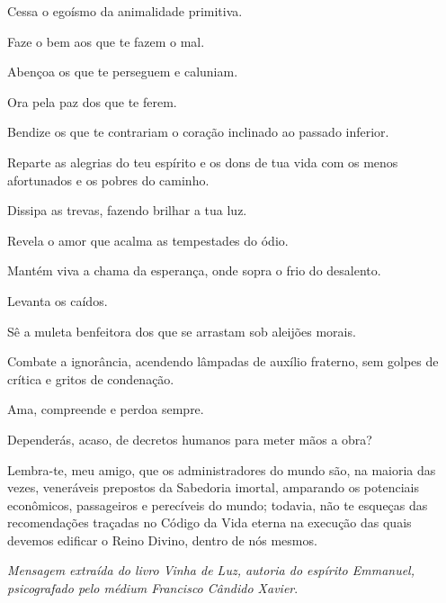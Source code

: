 \emdash{}Cessa o egoísmo da animalidade primitiva.

\emdash{}Faze o bem aos que te fazem o mal.

\emdash{}Abençoa os que te perseguem e caluniam.

\emdash{}Ora pela paz dos que te ferem.

\emdash{}Bendize os que te contrariam o coração inclinado ao passado inferior.

\emdash{}Reparte as alegrias do teu espírito e os dons de tua vida com os menos afortunados e os pobres do caminho.

\emdash{}Dissipa as trevas, fazendo brilhar a tua luz.

\emdash{}Revela o amor que acalma as tempestades do ódio.

\emdash{}Mantém viva a chama da esperança, onde sopra o frio do desalento.

\emdash{}Levanta os caídos.

\emdash{}Sê a muleta benfeitora dos que se arrastam sob aleijões morais.

\emdash{}Combate a ignorância, acendendo lâmpadas de auxílio fraterno, sem golpes de crítica e gritos de condenação.

\emdash{}Ama, compreende e perdoa sempre.

\emdash{}Dependerás, acaso, de decretos humanos para meter mãos a obra?

\emdash{}Lembra-te, meu amigo, que os administradores do mundo são, na maioria das vezes, veneráveis prepostos da Sabedoria imortal, amparando os potenciais econômicos, passageiros e perecíveis do mundo; todavia, não te esqueças das recomendações traçadas no Código da Vida eterna na execução das quais devemos edificar o Reino Divino, dentro de nós mesmos.

\textit{Mensagem extraída do livro Vinha de Luz, autoria do espírito Emmanuel, psicografado pelo médium Francisco Cândido Xavier}.